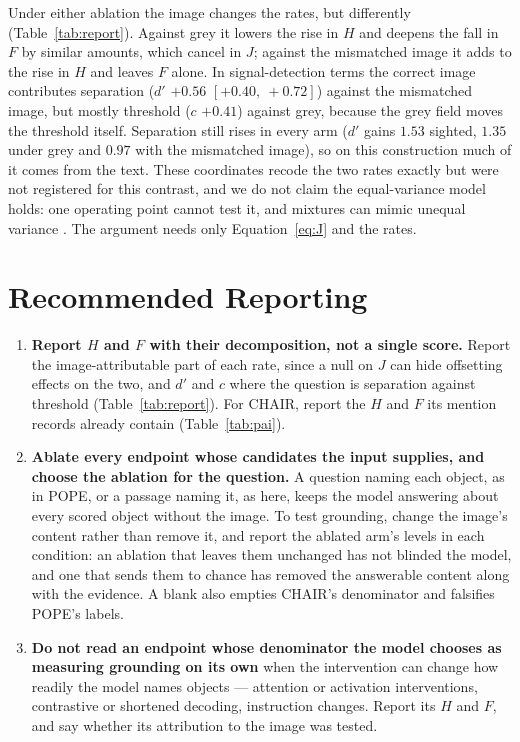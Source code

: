 \documentclass{article} %
\newcommand{\civ}[2]{$[#1,\ #2]$}
\begin{document}
\label{sec:decomp}Under either ablation the image changes the rates, but differently
(Table~\ref{tab:report}). Against grey it lowers the rise in $H$ and deepens the fall in $F$ by
similar amounts, which cancel in $J$; against the mismatched image it adds to the rise in $H$ and
leaves $F$ alone. In signal-detection terms the correct image contributes separation ($d'$ $+0.56$
\civ{+0.40}{+0.72}) against the mismatched image, but mostly threshold ($c$ $+0.41$) against grey,
because the grey field moves the threshold itself. Separation still rises in every arm ($d'$ gains
$1.53$ sighted, $1.35$ under grey and $0.97$ with the mismatched image), so on this construction
much of it comes from the text. These
coordinates recode the two rates exactly but were not registered for this contrast, and we do not
claim the equal-variance model holds: one operating point cannot test it, and mixtures can mimic
unequal variance \citep{decarlo2002}. The argument needs only Equation~\ref{eq:J} and the rates.

\section{Recommended Reporting}
\label{sec:reco}

\begin{enumerate}
\itemsep0.1em
\item \textbf{Report $H$ and $F$ with their decomposition, not a single score.} Report the
image-attributable part of each rate, since a null on $J$ can hide offsetting effects on the two, and
$d'$ and $c$ where the question is separation against threshold (Table~\ref{tab:report}). For CHAIR,
report the $H$ and $F$ its mention records already contain (Table~\ref{tab:pai}).
\item \textbf{Ablate every endpoint whose candidates the input supplies, and choose the ablation for
the question.} A question naming each object, as in POPE, or a passage naming it, as here, keeps the
model answering about every scored object without the image. To test grounding, change the image's
content rather than remove it, and report the ablated arm's levels in each condition: an ablation
that leaves them unchanged has not blinded the model, and one that sends them to chance has removed
the answerable content along with the evidence. A blank also empties CHAIR's denominator and falsifies
POPE's labels.
\item \textbf{Do not read an endpoint whose denominator the model chooses as measuring grounding on its
own} when the intervention can change how readily the model names objects --- attention or activation
interventions, contrastive or shortened decoding, instruction changes. Report its $H$ and $F$, and say
whether its attribution to the image was tested.
\end{enumerate}
\end{document}

